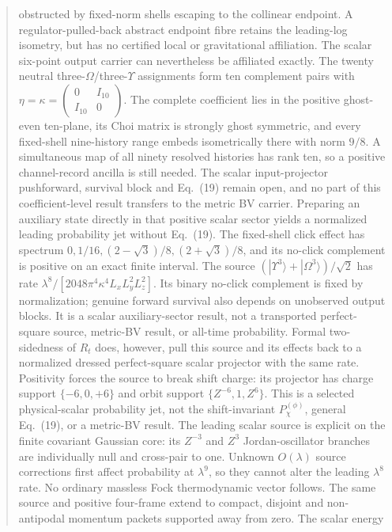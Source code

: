 \documentclass[11pt]{article}
\theoremstyle{definition}
\theoremstyle{remark}
\begin{document}
\begin{abstract}
obstructed by fixed-norm shells escaping to the collinear endpoint.  A
regulator-pulled-back abstract endpoint fibre retains the leading-log
isometry, but has no certified local or gravitational affiliation.
The scalar six-point output carrier can nevertheless be affiliated exactly.
The twenty neutral three-$\Omega$/three-$\Upsilon$ assignments form ten
complement pairs with
$\eta=\kappa=\left(\begin{smallmatrix}0&I_{10}\\I_{10}&0\end{smallmatrix}\right)$.
The complete coefficient lies in the positive ghost-even ten-plane, its Choi
matrix is strongly ghost symmetric, and every fixed-shell nine-history range
embeds isometrically there with norm $9/8$.  A simultaneous map of all ninety
resolved histories has rank ten, so a positive channel-record ancilla is still
needed.  The scalar input-projector pushforward, survival block and Eq.~(19)
remain open, and no part of this coefficient-level result transfers to the
metric BV carrier.
Preparing an auxiliary state directly in that positive scalar sector yields a
normalized leading probability jet without Eq.~(19).  The fixed-shell click
effect has spectrum $0,1/16,(2-\sqrt3)/8,(2+\sqrt3)/8$, and its no-click
complement is positive on an exact finite interval.  The source
$(|\Upsilon^3\rangle+|\Omega^3\rangle)/\sqrt2$ has rate
$\lambda^8/[2048\pi^4\kappa^4L_xL_y^2L_z^2]$.  Its binary no-click complement
is fixed by normalization; genuine forward survival also depends on
unobserved output blocks.  It is a scalar auxiliary-sector result, not a
transported perfect-square source, metric-BV result, or all-time probability.
Formal two-sidedness of $R_t$ does, however, pull this source and its effects
back to a normalized dressed perfect-square scalar projector with the same
rate.  Positivity forces the source to break shift charge: its projector has
charge support $\{-6,0,+6\}$ and orbit support $\{Z^{-6},1,Z^6\}$.  This is a
selected physical-scalar probability jet, not the shift-invariant
$P_\chi^{(\phi)}$, general Eq.~(19), or a metric-BV result.
The leading scalar source is explicit on the finite covariant Gaussian core:
its $Z^{-3}$ and $Z^3$ Jordan-oscillator branches are individually null and
cross-pair to one.  Unknown $O(\lambda)$ source corrections first affect
probability at $\lambda^9$, so they cannot alter the leading $\lambda^8$
rate.  No ordinary massless Fock thermodynamic vector follows.
The same source and positive four-frame extend to compact, disjoint and
non-antipodal momentum packets supported away from zero.  The scalar energy

\end{abstract}
\end{document}
